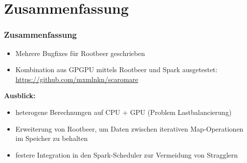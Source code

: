 \section{Zusammenfassung}
\begin{frame}
	\frametitle{Zusammenfassung}
	\begin{itemize}
        \item Mehrere Bugfixes für Rootbeer geschrieben
		\item Kombination aus GPGPU mittels Rootbeer und Spark ausgetestet: \url{https://github.com/mxmlnkn/scaromare}
	\end{itemize}
    \textbf{Ausblick:}
    \begin{itemize}
       \item heterogene Berechnungen auf CPU + GPU (Problem Lastbalancierung) %
       \item Erweiterung von Rootbeer, um Daten zwischen iterativen Map-Operationen im Speicher zu behalten
       \item festere Integration in den Spark-Scheduler zur Vermeidung von Stragglern
    \end{itemize}
\end{frame}




